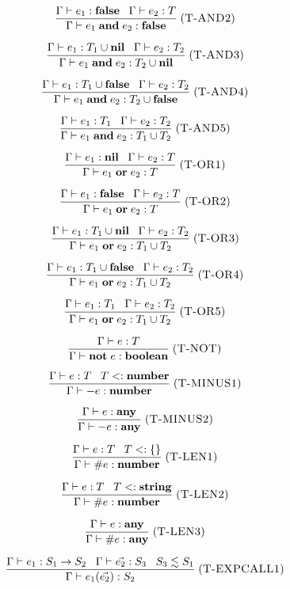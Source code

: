 \documentclass[12pt]{article}
\newcommand{\Any}{\mathbf{any}}
\newcommand{\Nil}{\mathbf{nil}}
\newcommand{\False}{\mathbf{false}}
\newcommand{\Boolean}{\mathbf{boolean}}
\newcommand{\Number}{\mathbf{number}}
\newcommand{\String}{\mathbf{string}}
\newcommand{\kw}[1]{\mathbf{#1}}
\newcommand{\mylabel}[1]{\; (\textsc{#1})}
\newcommand{\subtype}{<:}
\newcommand{\env}{\Gamma}
\begin{document}
\[
\frac{\env \vdash e_{1}:\False \;\;\;
      \env \vdash e_{2}:T}
     {\env \vdash e_{1} \; \kw{and} \; e_{2} : \False}
\mylabel{T-AND2}
\]

\[
\frac{\env \vdash e_{1}:T_{1} \cup \Nil \;\;\;
      \env \vdash e_{2}:T_{2}}
     {\env \vdash e_{1} \; \kw{and} \; e_{2} : T_{2} \cup \Nil}
\mylabel{T-AND3}
\]

\[
\frac{\env \vdash e_{1}:T_{1} \cup \False \;\;\;
      \env \vdash e_{2}:T_{2}}
     {\env \vdash e_{1} \; \kw{and} \; e_{2} : T_{2} \cup \False}
\mylabel{T-AND4}
\]

\[
\frac{\env \vdash e_{1}:T_{1} \;\;\;
      \env \vdash e_{2}:T_{2}}
     {\env \vdash e_{1} \; \kw{and} \; e_{2} : T_{1} \cup T_{2}}
\mylabel{T-AND5}
\]

\[
\frac{\env \vdash e_{1}:\Nil \;\;\;
      \env \vdash e_{2}:T}
     {\env \vdash e_{1} \; \kw{or} \; e_{2} : T}
\mylabel{T-OR1}
\]

\[
\frac{\env \vdash e_{1}:\False \;\;\;
      \env \vdash e_{2}:T}
     {\env \vdash e_{1} \; \kw{or} \; e_{2} : T}
\mylabel{T-OR2}
\]

\[
\frac{\env \vdash e_{1}:T_{1} \cup \Nil \;\;\;
      \env \vdash e_{2}:T_{2}}
     {\env \vdash e_{1} \; \kw{or} \; e_{2} : T_{1} \cup T_{2}}
\mylabel{T-OR3}
\]

\[
\frac{\env \vdash e_{1}:T_{1} \cup \False \;\;\;
      \env \vdash e_{2}:T_{2}}
     {\env \vdash e_{1} \; \kw{or} \; e_{2} : T_{1} \cup T_{2}}
\mylabel{T-OR4}
\]

\[
\frac{\env \vdash e_{1}:T_{1} \;\;\;
      \env \vdash e_{2}:T_{2}}
     {\env \vdash e_{1} \; \kw{or} \; e_{2} : T_{1} \cup T_{2}}
\mylabel{T-OR5}
\]

\[
\frac{\env \vdash e:T}
     {\env \vdash \kw{not} \; e : \Boolean}
\mylabel{T-NOT}
\]

\[
\frac{\env \vdash e:T \;\;\;
      T \subtype \Number}
     {\env \vdash - e : \Number}
\mylabel{T-MINUS1}
\]

\[
\frac{\env \vdash e:\Any}
     {\env \vdash - e : \Any}
\mylabel{T-MINUS2}
\]

\[
\frac{\env \vdash e:T \;\;\;
      T \subtype \{\}}
     {\env \vdash \# e : \Number}
\mylabel{T-LEN1}
\]

\[
\frac{\env \vdash e:T \;\;\;
      T \subtype \String}
     {\env \vdash \# e : \Number}
\mylabel{T-LEN2}
\]

\[
\frac{\env \vdash e:\Any}
     {\env \vdash \# e : \Any}
\mylabel{T-LEN3}
\]

\[
\frac{\env \vdash e_{1}:S_{1} \rightarrow S_{2} \;\;\;
      \env \vdash \vec{e_{2}}:S_{3} \;\;\;
      S_{3} \lesssim S_{1}}
     {\env \vdash e_{1}(\vec{e_{2}}) : S_{2}}
\mylabel{T-EXPCALL1}
\]
\end{document}
